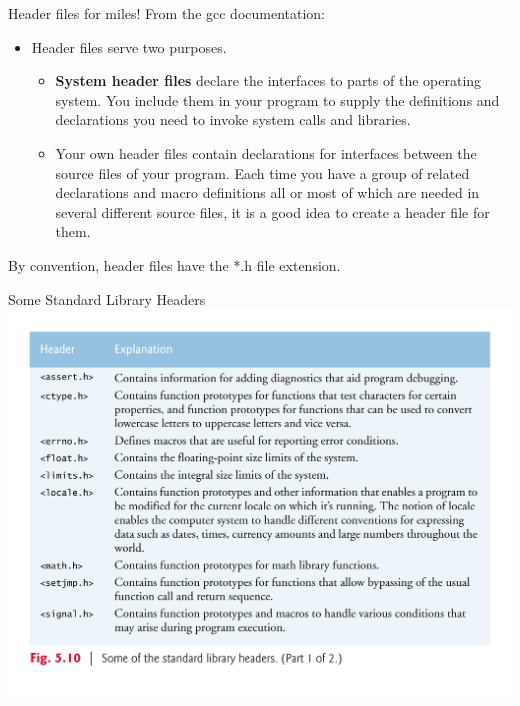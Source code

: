 \documentclass[11pt]{beamer}
\begin{document}
\begin{frame}{Header files for miles!}
From the gcc documentation:
\begin{itemize}
\item Header files serve two purposes. 
\begin{itemize}
\item \textbf{System header files} declare the interfaces to parts of the operating system. You include them in your program to supply the definitions and declarations you need to invoke system calls and libraries. 
\item Your own header files contain declarations for interfaces between the source files of your program. Each time you have a group of related declarations and macro definitions all or most of which are needed in several different source files, it is a good idea to create a header file for them. 
\end{itemize}
\end{itemize}
By convention, header files have the *.h file extension.
\end{frame}

\begin{frame}{Some Standard Library Headers}
\center
\includegraphics[scale=0.33]{headers1.png}
\end{frame}
\end{document}
